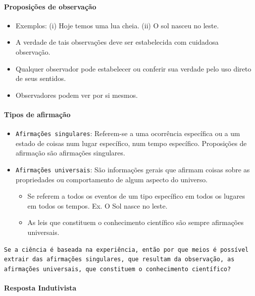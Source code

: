 \documentclass[9pt,a4paper]{extarticle}
\newcommand{\impt}[1]{\textcolor{important}{#1}}
\newcommand{\ntc}[1]{\textcolor{notice}{#1}}
\begin{document}
\paragraph{Proposições de observação}
        \begin{itemize}
            \item Exemplos: (i) Hoje temos uma lua cheia. (ii) O sol nasceu no leste.
            \item A verdade de tais observações deve ser estabelecida com cuidadosa observação.
            \item Qualquer observador pode estabelecer ou conferir sua verdade pelo uso direto de seus sentidos.
            \item Observadores podem ver por si mesmos. 
        \end{itemize}

\paragraph{Tipos de afirmação}
    \begin{itemize}
        \item \texttt{Afirmações singulares}: Referem-se a uma ocorrência específica ou a um estado de coisas num lugar específico, num tempo específico. \ntc{Proposições de afirmação são afirmações singulares.}
        \item \texttt{Afirmações universais}: São informações gerais que afirmam coisas sobre as propriedades ou comportamento de algum aspecto do universo. 
        \begin{itemize}
            \item Se referem a todos os eventos de um tipo específico em todos os lugares em todos os tempos. Ex. O Sol nasce no leste.
            \item \impt{As leis que constituem o conhecimento científico são sempre afirmações universais.}
        \end{itemize}
    \end{itemize}

\texttt{Se a ciência é baseada na experiência, então por que meios é possível extrair das afirmações singulares, que resultam da observação, as afirmações universais, que constituem o conhecimento científico?}

\paragraph{Resposta Indutivista}
\end{document}
